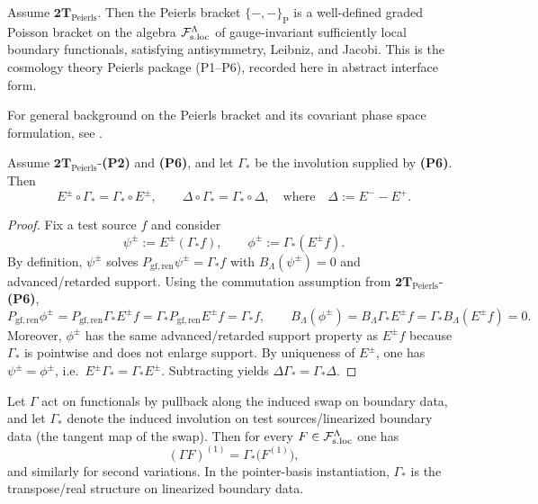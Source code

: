 \begin{theorem}
\label{thm:cosmo-derived-Peierls}
Assume $\mathbf{2T}_{\mathrm{Peierls}}$. Then the Peierls bracket
$\{-,-\}_{\mathrm P}$ is a well-defined graded Poisson bracket on the algebra
$\mathcal F_{\mathrm{s.loc}}^\Lambda$ of gauge-invariant sufficiently local
boundary functionals, satisfying antisymmetry, Leibniz, and Jacobi.  This is
the cosmology theory Peierls package (P1--P6), recorded here in abstract
interface form.
\end{theorem}

\begin{remark}
For general background on the Peierls bracket and its covariant phase space
formulation, see \cite{Peierls1952,Khavkine2014Peierls}.
\end{remark}

\begin{lemma}
\label{lem:GammaStar-commutes-Greens}
Assume $\mathbf{2T}_{\mathrm{Peierls}}$-\textbf{(P2)} and
\textbf{(P6)}, and let $\Gamma_*$ be the involution supplied by
\textbf{(P6)}.
Then
\[
E^\pm\circ\Gamma_*=\Gamma_*\circ E^\pm,
\qquad
\Delta\circ\Gamma_*=\Gamma_*\circ\Delta,
\quad\text{where}\quad \Delta:=E^- - E^+.
\]
\end{lemma}

\begin{proof}
Fix a test source $f$ and consider
\[
\psi^\pm := E^\pm(\Gamma_* f),
\qquad
\phi^\pm := \Gamma_*(E^\pm f).
\]
By definition, $\psi^\pm$ solves $P_{\mathrm{gf,ren}}\psi^\pm=\Gamma_* f$ with
$B_\Lambda(\psi^\pm)=0$ and advanced/retarded support. Using the commutation
assumption from $\mathbf{2T}_{\mathrm{Peierls}}$-\textbf{(P6)},
\[
P_{\mathrm{gf,ren}}\phi^\pm
= P_{\mathrm{gf,ren}}\Gamma_*E^\pm f
= \Gamma_* P_{\mathrm{gf,ren}}E^\pm f
= \Gamma_* f,
\qquad
B_\Lambda(\phi^\pm)
= B_\Lambda\Gamma_*E^\pm f
= \Gamma_* B_\Lambda(E^\pm f)
= 0.
\]
Moreover, $\phi^\pm$ has the same advanced/retarded support property as $E^\pm
f$ because $\Gamma_*$ is pointwise and does not enlarge support. By uniqueness
of $E^\pm$, one has $\psi^\pm=\phi^\pm$, i.e.\ $E^\pm\Gamma_*=\Gamma_*E^\pm$.
Subtracting yields $\Delta\Gamma_*=\Gamma_*\Delta$.
\end{proof}

\begin{lemma}
\label{lem:Gamma-star-dictionary}
Let $\Gamma$ act on functionals by pullback along the induced swap on boundary
data, and let $\Gamma_*$ denote the induced involution on test sources/linearized
boundary data (the tangent map of the swap). Then for every $F\in\mathcal F_{\mathrm{s.loc}}^\Lambda$ one has
\[
(\Gamma F)^{(1)}=\Gamma_*\big(F^{(1)}\big),
\]
and similarly for second variations. In the pointer-basis instantiation,
$\Gamma_*$ is the transpose/real structure on linearized boundary data.
\end{lemma}

